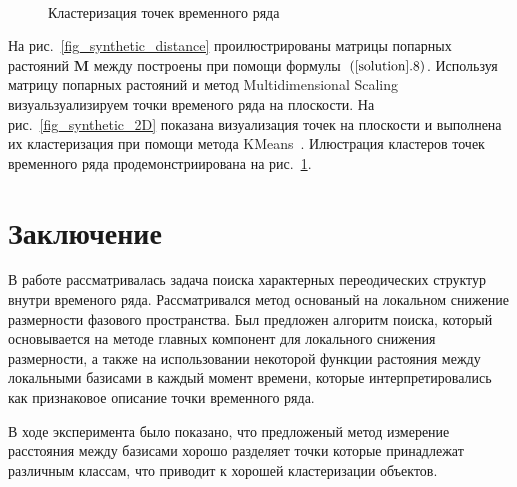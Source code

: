 \documentclass[12pt, twoside]{article}
\begin{document}
\begin{figure}[h!t]\center
{}
\\
\caption{Кластеризация точек временного ряда}
\label{fig_synthetic_claster}
\end{figure}

На рис.~\ref{fig_synthetic_distance} проилюстрированы матрицы попарных растояний $\textbf{M}$ между построены при помощи формулы~$(\ref{solution}.8)$. Используя матрицу попарных растояний и метод Multidimensional Scaling~\cite{Borg2005} визуальзуализируем точки временого ряда на плоскости. На рис.~\ref{fig_synthetic_2D} показана визуализация точек на плоскости и выполнена их кластеризация при помощи метода KMeans~\cite{Kanungo2000}. Илюстрация кластеров точек временного ряда продемонстриирована на рис.~\ref{fig_synthetic_claster}.



\section{Заключение}
В работе рассматривалась задача поиска характерных переодических структур внутри временого ряда. Рассматривался метод основаный на локальном снижение размерности фазового пространства. Был предложен алгоритм поиска, который основывается на методе главных компонент для локального снижения размерности, а также на использовании некоторой функции растояния между локальными базисами в каждый момент времени, которые интерпретировались как признаковое описание точки временного ряда.

В ходе эксперимента было показано, что предложеный метод измерение расстояния между базисами хорошо разделяет точки которые принадлежат различным классам, что приводит к хорошей кластеризации объектов.
\end{document}
